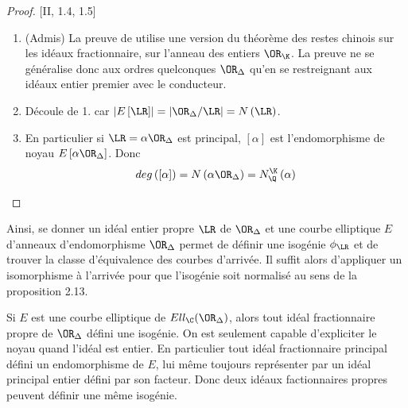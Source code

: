 \begin{proof}\cite{Sil94}[II, 1.4, 1.5]
	
	\begin{enumerate}
		\item (Admis) La preuve de \cite{Sil94} utilise une version du théorème des restes chinois sur les idéaux fractionnaire, sur l'anneau des entiers $\OR_{\K}$. La preuve ne se généralise donc aux ordres quelconques $\OR_{\Delta}$ qu'en se restreignant aux idéaux entier premier avec le conducteur.  
		
		\item Découle de 1. car $\left| E\left[\LR\right]\right| = \left| \OR_{\Delta}/\LR\right| = N\left( \LR\right)$.
		
		\item En particulier si $\LR = \alpha\OR_{\Delta}$ est principal, $[\alpha]$ est l'endomorphisme de noyau $E\left[\alpha\OR_{\Delta}\right]$. Donc 
		\begin{equation*}
			deg \left( \left[\alpha \right] \right) = N\left( \alpha\OR_{\Delta}\right) = N_{\Q}^{\K}\left( \alpha\right) 
		\end{equation*}
	\end{enumerate}
\end{proof}


Ainsi, se donner un idéal entier propre $\LR$ de $\OR_{\Delta}$ et une courbe elliptique $E$ d'anneaux d'endomorphisme $\OR_{\Delta}$ permet de définir une isogénie $\phi_{\LR}$ et de trouver la classe d'équivalence des courbes d'arrivée. Il suffit alors d'appliquer un isomorphisme à l'arrivée pour que l'isogénie soit normalisé au sens de la proposition 2.13. 



\begin{Rem}
	Si $E$ est une courbe elliptique de $Ell_{\C}(\OR_{\Delta})$, alors tout idéal fractionnaire propre de $\OR_{\Delta}$ défini une isogénie. On est seulement capable d'expliciter le noyau quand l'idéal est entier. En particulier tout idéal fractionnaire principal défini un endomorphisme de $E$, lui même toujours représenter par un idéal principal entier défini par son facteur. Donc deux idéaux factionnaires propres peuvent définir une même isogénie. 
\end{Rem}